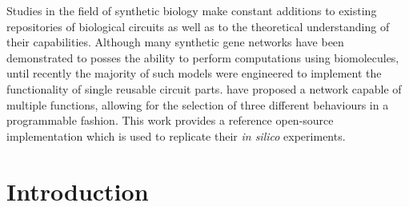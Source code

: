 
  Studies in the field of synthetic biology make constant additions to existing repositories of biological circuits as well as to the theoretical understanding of their capabilities.
  Although many synthetic gene networks have been demonstrated to posses the ability to perform computations using biomolecules, until recently the majority of such models were engineered to implement the functionality of single reusable circuit parts.
  \citet{originals} have proposed a network capable of multiple functions, allowing for the selection of three different behaviours in a programmable fashion.
  This work provides a reference open-source implementation which is used to replicate their \textit{in silico} experiments.


\section{Introduction}





